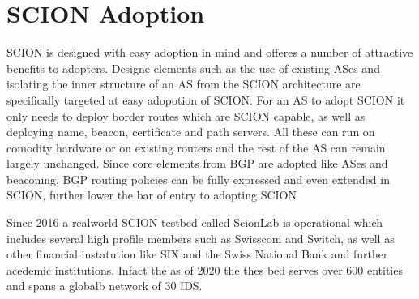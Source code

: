 \documentclass[../eva1_scion.tex]{subfiles}
\begin{document}
    \section{SCION Adoption}
    SCION is designed with easy adoption in mind and offeres a number of attractive benefits to adopters. Designe elements such as the use of existing ASes and isolating the inner structure of an AS from the SCION architecture are specifically targeted at easy adopotion of SCION. For an AS to adopt SCION it only needs to deploy border routes which are SCION capable, as well as deploying name, beacon, certificate and path servers. All these can run on comodity hardware or on existing routers and the rest of the AS can remain largely unchanged. Since core elements from BGP are adopted like ASes and beaconing, BGP routing policies can be fully expressed and even extended in SCION, further lower the bar of entry to adopting SCION \cite{scion_2017}

    Since 2016 a realworld SCION testbed called ScionLab is operational \cite{testbed_2020} which includes several high profile members such as Swisscom and Switch, as well as other financial instatution like SIX and the Swiss National Bank \cite{snb} and further acedemic institutions. Infact the as of 2020 the thes bed serves over 600 entities and spans a globalb network of 30 IDS.
\end{document}
